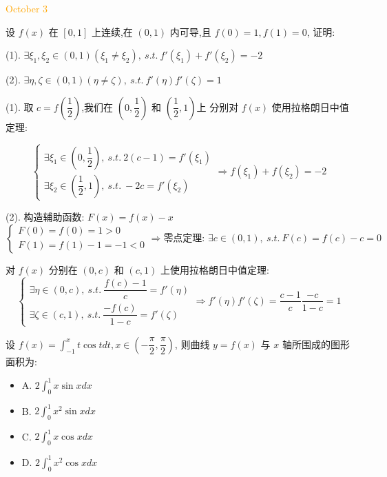 \textcolor{orange}{October 3}

\begin{example}[][Exam: 36.1.5]
	设 $f(x)$ 在 $[0,1]$ 上连续,在 $(0,1)$ 内可导,且 $f(0)=1,f(1)=0$, 证明:

(1). $\exists \xi_{1},\xi_{2}\in(0,1)(\xi_{1}\neq \xi_{2}),\ s.t.\ f'(\xi_{1})+f'(\xi_{2})=-2$

(2). $\exists \eta,\zeta\in(0,1)(\eta\neq \zeta),\ s.t.\ f'(\eta)f'(\zeta)=1$
\end{example}

\begin{solution}

	(1). 取 $c=f(\dfrac{1}{2})$,我们在 $(0,\dfrac{1}{2})$ 和 $(\dfrac{1}{2},1)$上
	分别对 $f(x)$ 使用拉格朗日中值定理:  
	
	$$\begin{cases}
		\exists \xi_{1}\in(0,\dfrac{1}{2}),\ s.t.\ 2(c-1) = f'(\xi_{1}) \\
		\exists \xi_{2}\in(\dfrac{1}{2},1),\ s.t.\ -2c = f'(\xi_{2})
	\end{cases}
	\Rightarrow f(\xi_{1})+f(\xi_{2})=-2$$
	
	(2). 构造辅助函数: $F(x)=f(x)-x$  
	$$\begin{cases}
		F(0) = f(0) = 1 > 0 \\
		F(1) = f(1) - 1 = -1 < 0
	\end{cases}\Rightarrow \text{零点定理: }
	\exists c\in(0,1),\ s.t.\ F(c) = f(c) - c = 0$$
	
	对 $f(x)$ 分别在 $(0,c)$ 和 $(c,1)$ 上使用拉格朗日中值定理:  
	$$\begin{cases}
		\exists\eta\in(0,c),\ s.t.\ \dfrac{f(c)-1}{c} = f'(\eta)\\
		\exists\zeta\in(c,1),\ s.t.\ \dfrac{-f(c)}{1-c} = f'(\zeta)
	\end{cases}\Rightarrow 
	f'(\eta)f'(\zeta) = \dfrac{c-1}{c}\dfrac{-c}{1-c} = 1$$
\end{solution}

\begin{example}[][Exam: 36.1.6]
	设 $\displaystyle{f(x)=\int_{-1}^{x}t\cos tdt,x\in(-\dfrac{\pi}{2},\dfrac{\pi}{2})}$,
则曲线 $y=f(x)$ 与 $x$ 轴所围成的图形面积为:  
\begin{itemize}
	\item A. $2\int_{0}^{1}x\sin xdx$
	\item B. $2\int_{0}^{1}x^2\sin xdx$
	\item C. $2\int_{0}^{1}x\cos xdx$
	\item D. $2\int_{0}^{1}x^2\cos xdx$
\end{itemize}
\end{example}

